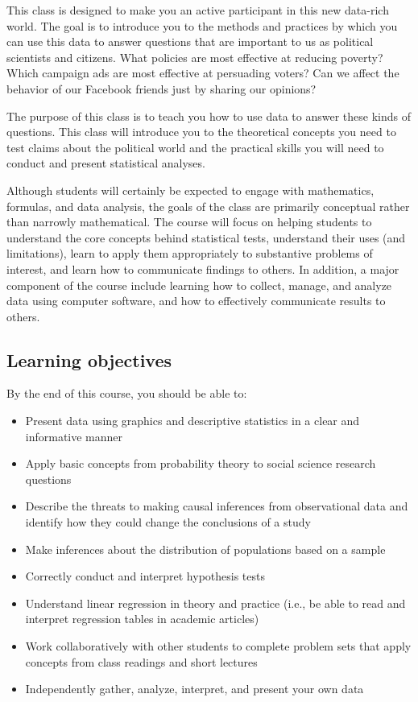 \documentclass[11pt]{article}
\begin{document}
This class is designed to make you an active participant in this new
data-rich world.  The goal is to introduce you to the methods and
practices by which you can use this data to answer questions that are
important to us as political scientists and citizens.  What policies
are most effective at reducing poverty?  Which campaign ads are most
effective at persuading voters?  Can we affect the behavior of our
Facebook friends just by sharing our opinions?
 
The purpose of this class is to teach you how to use data to answer
these kinds of questions.  This class will introduce you to the
theoretical concepts you need to test claims about the political world
and the practical skills you will need to conduct and present
statistical analyses.
 
Although students will certainly be expected to engage with
mathematics, formulas, and data analysis, the goals of the class are
primarily conceptual rather than narrowly mathematical. The course
will focus on helping students to understand the core concepts behind
statistical tests, understand their uses (and limitations), learn to
apply them appropriately to substantive problems of interest, and
learn how to communicate findings to others.  In addition, a major
component of the course include learning how to collect, manage, and
analyze data using computer software, and how to effectively
communicate results to others.
 
\subsection*{Learning objectives}

By the end of this course, you should be able to:

\begin{itemize}
\item Present data using graphics and descriptive statistics in a clear and informative manner
\item Apply basic concepts from probability theory to social science research questions
\item Describe the threats to making causal inferences from observational data and identify how they could change the conclusions of a study
\item Make inferences about the distribution of populations based on a sample 
\item Correctly conduct and interpret hypothesis tests
\item Understand linear regression in theory and practice (i.e., be able to read and interpret regression tables in academic articles)
\item Work collaboratively with other students to complete problem sets that apply concepts from class readings and short lectures
\item Independently gather, analyze, interpret, and present your own data
\end{itemize}
\end{document}
